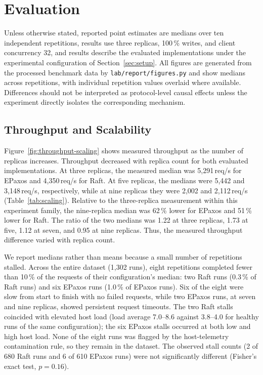 \section{Evaluation}

\label{sec:evaluation}

Unless otherwise stated, reported point estimates are medians over ten
independent repetitions, results use three replicas, 100\,\% writes, and
client concurrency 32, and results describe the evaluated implementations
under the experimental configuration of Section~\ref{sec:setup}. All
figures are generated from the processed benchmark data by
\texttt{lab/report/figures.py} and show medians across repetitions, with
individual repetition values overlaid where available. Differences should
not be interpreted as protocol-level causal effects unless the experiment
directly isolates the corresponding mechanism.

\subsection{Throughput and Scalability}

Figure~\ref{fig:throughput-scaling} shows measured throughput as the
number of replicas increases. Throughput decreased with replica count for
both evaluated implementations. At three replicas, the measured median was
5{,}291\,req/s for EPaxos and 4{,}350\,req/s for Raft. At five replicas,
the medians were 5{,}442 and 3{,}148\,req/s, respectively, while at nine
replicas they were 2{,}002 and 2{,}112\,req/s (Table~\ref{tab:scaling}).
Relative to the three-replica measurement within this experiment family,
the nine-replica median was 62\,\% lower for EPaxos and 51\,\% lower for
Raft. The ratio of the two medians was 1.22 at three replicas, 1.73 at
five, 1.12 at seven, and 0.95 at nine replicas. Thus, the measured
throughput difference varied with replica count.

We report medians rather than means because a small number of repetitions
stalled. Across the entire dataset (1{,}302 runs), eight repetitions
completed fewer than 10\,\% of the requests of their configuration's
median: two Raft runs (0.3\,\% of Raft runs) and six EPaxos runs (1.0\,\%
of EPaxos runs). Six of the eight were slow from start to finish with no
failed requests, while two EPaxos runs, at seven and nine replicas, showed
persistent request timeouts. The two Raft stalls coincided with elevated
host load (load average 7.0--8.6 against 3.8--4.0 for healthy runs of the
same configuration); the six EPaxos stalls occurred at both low and high
host load. None of the eight runs was flagged by the host-telemetry
contamination rule, so they remain in the dataset. The observed stall
counts (2 of 680 Raft runs and 6 of 610 EPaxos runs) were not significantly
different (Fisher's exact test, $p=0.16$).


